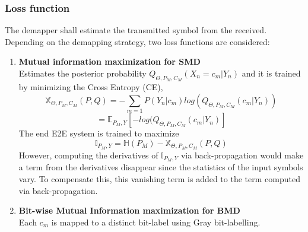 \documentclass[11pt]{article}
\begin{document}
\subsubsection{Loss function}
The demapper shall estimate the transmitted symbol from the received. Depending on the demapping strategy, two loss functions are considered:
\begin{enumerate}
\item \textbf{Mutual information maximization for SMD}\\
Estimates the posterior probability $Q_{\Theta, P_{M}, C_{M}}(X_{n}=c_{m}|Y_{n})$ and it is trained by minimizing the Cross Entropy (CE),\begin{equation}
\mathbb{X}_{\Theta, P_{M}, C_{M}}(P,Q)= - \sum_{m=1}P(Y_{n}|c_{m})log(Q_{\Theta, P_{M}, C_{M}}(c_{m}|Y_{n}))
\end{equation}
\begin{equation}
= \mathbb{E}_{P_{M},Y}[-log(Q_{\Theta, P_{M}, C_{M}}(c_{m}|Y_{n})]
\end{equation}
The end E2E system is trained to maximize
\begin{equation}
\mathbb{I}_{P_{M},Y} = \mathbb{H}(P_{M}) - \mathbb{X}_{\Theta, P_{M}, C_{M}}(P,Q)
\end{equation}
However, computing the derivatives of $\mathbb{I}_{P_{M},Y}$ via back-propagation would make a term from the derivatives disappear since the statistics of the input symbols vary. To compensate this,  this vanishing term is added to the term computed via back-propagation.
\item \textbf{Bit-wise Mutual Information maximization for BMD}\\
Each $c_{m}$ is mapped to a distinct bit-label using Gray bit-labelling.
\end{enumerate}


\end{document}
